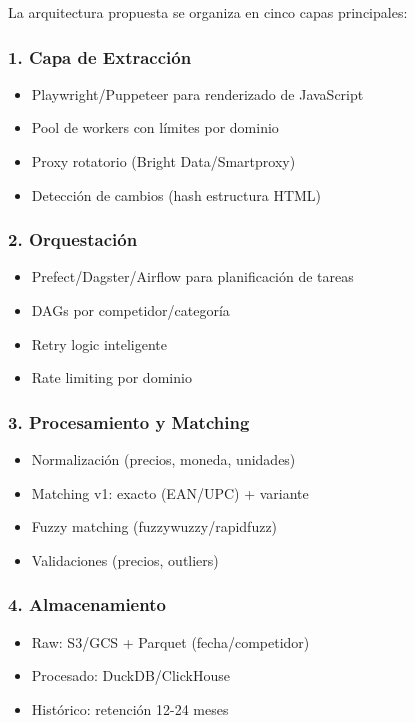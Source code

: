 \documentclass[12pt,a4paper]{article}
\begin{document}
La arquitectura propuesta se organiza en cinco capas principales:

\subsubsection*{1. Capa de Extracción}
\begin{itemize}[leftmargin=*]
    \item Playwright/Puppeteer para renderizado de JavaScript
    \item Pool de workers con límites por dominio
    \item Proxy rotatorio (Bright Data/Smartproxy)
    \item Detección de cambios (hash estructura HTML)
\end{itemize}

\subsubsection*{2. Orquestación}
\begin{itemize}[leftmargin=*]
    \item Prefect/Dagster/Airflow para planificación de tareas
    \item DAGs por competidor/categoría
    \item Retry logic inteligente
    \item Rate limiting por dominio
\end{itemize}

\subsubsection*{3. Procesamiento y Matching}
\begin{itemize}[leftmargin=*]
    \item Normalización (precios, moneda, unidades)
    \item Matching v1: exacto (EAN/UPC) + variante
    \item Fuzzy matching (fuzzywuzzy/rapidfuzz)
    \item Validaciones (precios, outliers)
\end{itemize}

\subsubsection*{4. Almacenamiento}
\begin{itemize}[leftmargin=*]
    \item Raw: S3/GCS + Parquet (fecha/competidor)
    \item Procesado: DuckDB/ClickHouse
    \item Histórico: retención 12-24 meses
\end{itemize}
\end{document}

